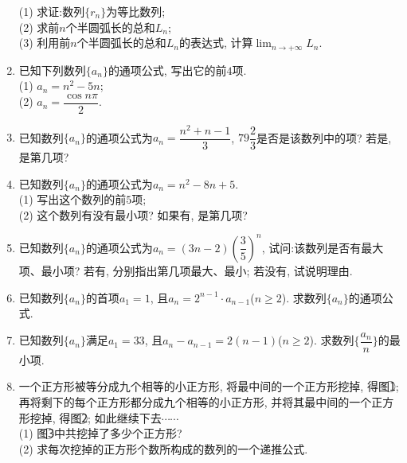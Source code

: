 \documentclass[10pt,a4paper]{article}
\begin{document}
\begin{enumerate}[1.]
(1) 求证:数列$\{r_n\}$为等比数列;\\
(2) 求前$n$个半圆弧长的总和$L_n$;\\
(3) 利用前$n$个半圆弧长的总和$L_n$的表达式, 计算$\displaystyle\lim_{n\to+\infty}L_n$.
\begin{center}
\end{center}
\item 已知下列数列$\{a_n\}$的通项公式, 写出它的前$4$项.\\
(1) $a_n=n^2-5n$;\\
(2) $a_n=\dfrac{\cos n\pi} 2$.
\item 已知数列$\{a_n\}$的通项公式为$a_n=\dfrac{n^2+n-1}3$, $79\dfrac 23$是否是该数列中的项? 若是, 是第几项?
\item 已知数列$\{a_n\}$的通项公式为$a_n=n^2-8n+5$.\\
(1) 写出这个数列的前$5$项;\\
(2) 这个数列有没有最小项? 如果有, 是第几项? 
\item 已知数列$\{a_n\}$的通项公式为$a_n=(3n-2)(\dfrac 35)^n$, 试问:该数列是否有最大项、最小项? 若有, 分别指出第几项最大、最小; 若没有, 试说明理由.
\item 已知数列$\{a_n\}$的首项$a_1=1$, 且$a_n=2^{n-1}\cdot a_{n-1}$($n\ge 2$). 求数列$\{a_n\}$的通项公式.
\item 已知数列$\{a_n\}$满足$a_1=33$, 且$a_n-a_{n-1}=2(n-1)$($n\ge 2$). 求数列$\{\dfrac{a_n}n\}$的最小项. 
\item 一个正方形被等分成九个相等的小正方形, 将最中间的一个正方形挖掉, 得图\textcircled{1}; 再将剩下的每个正方形都分成九个相等的小正方形, 并将其最中间的一个正方形挖掉, 得图\textcircled{2}; 如此继续下去$\cdots\cdots$\\
(1) 图\textcircled{3}中共挖掉了多少个正方形?\\
(2) 求每次挖掉的正方形个数所构成的数列的一个递推公式.
\begin{center}

\end{center}
\end{enumerate}
\end{document}
